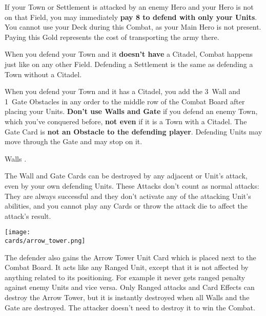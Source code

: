 \begin{multicols*}{2}
If your Town or Settlement is attacked by an enemy Hero and your Hero is not on that Field, you may immediately \textbf{pay 8  to defend with only your Units}.
You cannot use your Deck during this Combat, as your Main Hero is not present.
Paying this Gold represents the cost of transporting the army there.

When you defend your Town and it \textbf{doesn't have} a Citadel, Combat happens just like on any other Field.
Defending a Settlement is the same as defending a Town without a Citadel.

\vspace{0.5em}
\par

When you defend your Town and it has a Citadel, you add the 3~Wall and 1~Gate Obstacles in any order to the middle row of the Combat Board after placing your Units.
\textbf{Don't use Walls and Gate} if you defend an enemy Town, which you've conquered before, \textbf{not even} if it is a Town with a Citadel.
The Gate Card is \textbf{not an Obstacle to the defending player}.
Defending Units may move through the Gate and may stop on it.

Walls .

The Wall and Gate Cards can be destroyed by any adjacent  or  Unit's attack, even by your own defending Units.
These Attacks don't count as normal attacks: They are always successful and they don't activate any of the attacking Unit's  abilities, and you cannot play any Cards or throw the attack die to affect the attack's result.

\vspace*{\fill}
\columnbreak

\begin{center}
  \texttt{[image: \\cards/arrow\_tower.png]}
\end{center}
The defender also gains the Arrow Tower Unit Card which is placed next to the Combat Board.
It acts like any Ranged  Unit, except that it is not affected by anything related to its positioning.
For example it never gets ranged penalty against enemy Units and vice versa.
Only Ranged attacks and Card Effects can destroy the Arrow Tower, but it is instantly destroyed when all Walls and the Gate are destroyed.
The attacker doesn't need to destroy it to win the Combat.


\end{multicols*}
